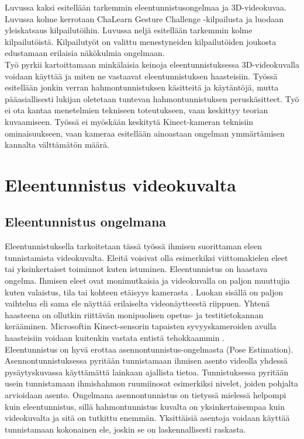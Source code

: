 Luvussa kaksi esitellään tarkemmin eleentunnistusongelmaa ja 3D-videokuvaa. Luvussa kolme kerrotaan
ChaLearn Gesture Challenge -kilpailusta ja luodaan yleiskatsaus kilpailutöihin. Luvussa neljä esitellään
tarkemmin kolme kilpailutöistä. Kilpailutyöt on valittu menestyneiden kilpailutöiden joukosta edustamaan erilaisia näkökulmia ongelmaan.\\

Työ pyrkii kartoittamaan minkälaisia keinoja eleentunnistuksessa 3D-videokuvalla voidaan käyttää ja miten ne vastaavat eleentunnistuksen haasteisiin.
Työssä esitellään jonkin verran hahmontunnistuksen käsitteitä ja käytäntöjä, mutta pääasiallisesti lukijan oletetaan tuntevan hahmontunnistuksen 
peruskäsitteet. Työ ei ota kantaa menetelmien tekniseen toteutukseen, vaan keskittyy teorian kuvaamiseen. Työssä ei myöskään keskitytä Kinect-kameran
teknisiin ominaisuukseen, vaan kameraa esitellään ainoastaan ongelman ymmärtämisen kannalta välttämätön määrä.


\section{Eleentunnistus videokuvalta}
\label{eleentunnistus videokuvalta}


\subsection{Eleentunnistus ongelmana}
Eleentunnistuksella tarkoitetaan tässä työssä ihmisen suorittaman eleen tunnistamista videokuvalta. Eleitä voisivat olla esimerkiksi
viittomakielen eleet tai yksinkertaiset toiminnot kuten istuminen. Eleentunnistus on haastava ongelma. Ihmisen eleet ovat
monimutkaisia ja videokuvalla on paljon muuttujia kuten valaistus, tila tai kohteen etäisyys kamerasta \citep {1251144}. 
Luokan sisällä on paljon vaihtelua eli sama ele näyttää erilaiselta videonäytteestä riippuen.
Yhtenä haasteena on ollutkin riittävän monipuolisen opetus- ja testitietokannan kerääminen.
\citep{4587756} Microsoftin Kinect-sensorin tapaisten syvyyskameroiden avulla haasteisiin voidaan kuitenkin vastata entistä tehokkaammin \citep {6239178}.\\

Eleentunnistus on hyvä erottaa asennontunnistus-ongelmasta (Pose Estimation).
Asennontunnistuksessa pyritään tunnistamaan ihmisen asento videolla yhdessä pysäytyskuvassa
käyttämättä lainkaan ajallista tietoa. Tunnistuksessa pyritään usein tunnistamaan ihmishahmon ruumiinosat esimerkiksi nivelet,
joiden pohjalta arvioidaan asento. \citep{5995316} Ongelmana asennontunnistus on tietyssä mielessä helpompi
kuin eleentunnistus, sillä hahmontunnistus kuvalta on yksinkertaisempaa kuin videokuvalta ja sitä on tutkittu enemmän. 
Yksittäisiä asentoja voidaan käyttää tunnistamaan kokonainen ele, joskin se on laskennallisesti raskasta.  \\


